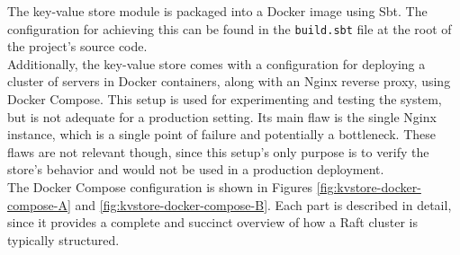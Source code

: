 The key-value store module is packaged into a Docker image using Sbt. The configuration for achieving this can be found in the \lstinline|build.sbt| file at the root of the project's source code.\\

Additionally, the key-value store comes with a configuration for deploying a cluster of servers in Docker containers, along with an Nginx reverse proxy, using Docker Compose. This setup is used for experimenting and testing the system, but is not adequate for a production setting. Its main flaw is the single Nginx instance, which is a single point of failure and potentially a bottleneck. These flaws are not relevant though, since this setup's only purpose is to verify the store's behavior and would not be used in a production deployment.\\

The Docker Compose configuration is shown in Figures \ref{fig:kvstore-docker-compose-A} and \ref{fig:kvstore-docker-compose-B}. Each part is described in detail, since it provides a complete and succinct overview of how a Raft cluster is typically structured.

